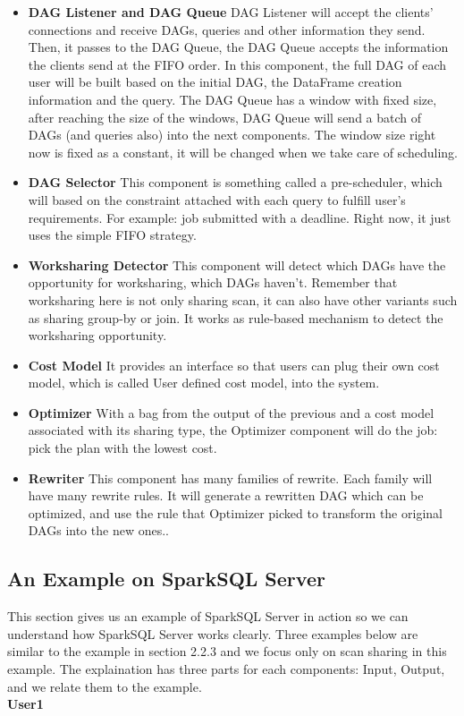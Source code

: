 \begin{itemize}
\item \textbf{DAG Listener and DAG Queue} DAG Listener will accept the clients’ connections and receive DAGs, queries and other information they send. Then, it passes to the DAG Queue, the DAG Queue accepts the information the clients send at the FIFO order. In this component, the full DAG of each user will be built based on the initial DAG, the DataFrame creation information and the query. The DAG Queue has a window with fixed size, after reaching the size of the windows, DAG Queue will send a batch of DAGs (and queries also) into the next components. The window size right now is fixed as a constant, it will be changed when we take care of scheduling.
\item \textbf{DAG Selector} This component is something called a pre-scheduler, which will based on the constraint attached with each query to fulfill user’s requirements. For example: job submitted with a deadline. Right now, it just uses the simple FIFO strategy.
\item \textbf{Worksharing Detector} This component will detect which DAGs have the opportunity for worksharing, which DAGs haven’t. Remember that worksharing here is not only sharing scan, it can also have other variants such as sharing group-by or join. It works as rule-based mechanism to detect the worksharing opportunity. 
\item \textbf{Cost Model} It provides an interface so that users can plug their own cost model, which is called User defined cost model, into the system.
\item \textbf{Optimizer} With a bag from the output of the previous and a cost model associated with its sharing type, the Optimizer component will do the job: pick the plan with the lowest cost.
\item \textbf{Rewriter} This component has many families of rewrite. Each family will have many rewrite rules. It will generate a rewritten DAG which can be optimized, and use the rule that Optimizer picked to transform the original DAGs into the new ones..
\end{itemize}

\subsection{An Example on SparkSQL Server}

This section gives us an example of SparkSQL Server in action so we can understand how SparkSQL Server works clearly.
Three examples below are similar to the example in section 2.2.3 and we focus only on scan sharing in this example. The explaination has three parts for each components: Input, Output, and we relate them to the example.\\
\textbf{User1}

